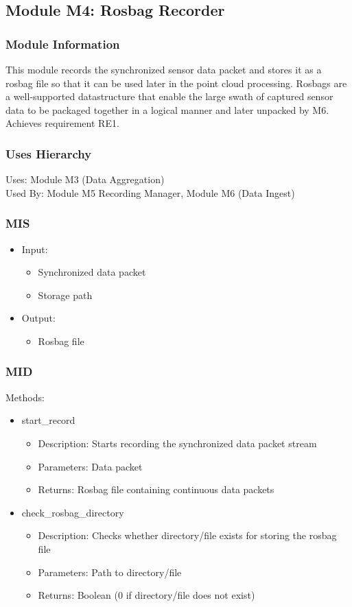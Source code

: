 \documentclass[11pt]{article}
\begin{document}
		\subsection{Module M4: Rosbag Recorder}
			\subsubsection{Module Information}
				This module records the synchronized sensor data packet and stores it as a rosbag file so that it can be used later in the point cloud processing. Rosbags are a well-supported datastructure that enable the large swath of captured sensor data to be packaged together in a logical manner and later unpacked by M6. Achieves requirement RE1.
			\subsubsection{Uses Hierarchy}
				Uses: Module M3 (Data Aggregation) \\
				Used By: Module M5 Recording Manager, Module M6 (Data Ingest)
			\subsubsection{MIS}
				\begin{itemize}
					\item Input:
						\begin{itemize}
							\item Synchronized data packet
							\item Storage path 
						\end{itemize}
					\item Output:
						\begin{itemize}
							\item Rosbag file 
						\end{itemize}
				\end{itemize}
			\subsubsection{MID}
			Methods:
			\begin{itemize}
				\item start\_record
					\begin{itemize}
						\item Description: Starts recording the synchronized data packet stream
						\item Parameters: Data packet
						\item Returns: Rosbag file containing continuous data packets
					\end{itemize}
				\item check\_rosbag\_directory
					\begin{itemize}
						\item Description: Checks whether directory/file exists for storing the rosbag file
						\item Parameters: Path to directory/file
						\item Returns: Boolean (0 if directory/file does not exist)
					\end{itemize}
			\end{itemize}
\end{document}
